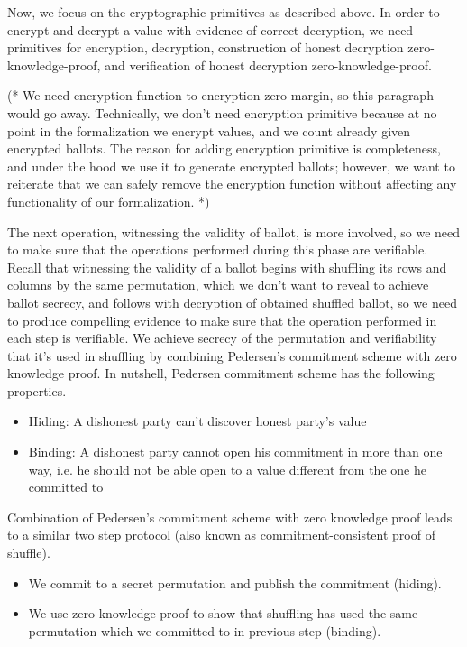 \documentclass{llncs}
\begin{document}
   
Now, we focus on the  cryptographic primitives as described above. 
In order to encrypt and decrypt a value with 
evidence of correct decryption, we need primitives for encryption, 
decryption, construction of
honest decryption zero-knowledge-proof, and verification of 
honest decryption zero-knowledge-proof.


(* We need encryption function to encryption zero margin, 
so this paragraph would go away. 
Technically, we don't need 
encryption primitive because at no point in the formalization we 
encrypt values, and we count already given encrypted ballots. 
The reason for adding encryption primitive is completeness, and 
under the hood we use it to generate encrypted ballots; however, we
want to reiterate that we can safely remove the encryption function 
without affecting any functionality of our formalization. *)


The next operation, witnessing the validity of ballot, 
is more involved, so we need to make 
sure that the operations performed during this phase are verifiable. 
Recall that witnessing 
the validity of a ballot begins with shuffling its rows and columns 
by the same permutation, which
we don't want to reveal to achieve ballot secrecy, and follows with 
decryption  of obtained shuffled ballot, so 
we need to produce compelling evidence 
to make sure that the operation performed in each step 
is verifiable. We achieve secrecy of the permutation and 
verifiability that it's used in shuffling by combining 
Pedersen's commitment \cite{Pederson} scheme with zero knowledge proof.
In nutshell, Pedersen commitment scheme has 
the following properties. 
\begin{itemize}
\item Hiding: A dishonest party can't discover honest party's value 
\item Binding: A dishonest party cannot open his commitment in more  
	 	than one way, i.e. he should not be able open to a value 
	 	different from the one he committed to 
\end{itemize}

Combination of Pedersen's commitment scheme 
with zero knowledge proof leads to a similar two step protocol (also known 
as commitment-consistent proof of shuffle).
\begin{itemize}
\item We commit to a secret permutation and publish the commitment (hiding).
\item We use zero knowledge proof to show that shuffling has used 
      the same permutation which we committed to in previous step (binding).
\end{itemize}  
\end{document}

